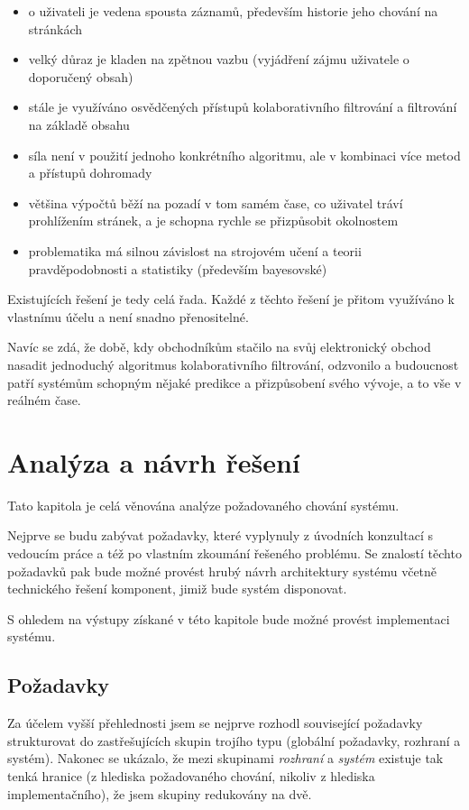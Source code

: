 \documentclass[thesis=M,czech]{FITthesis}[2014/05/07]
\begin{document}
\begin{itemize}
	\item o uživateli je vedena spousta záznamů, především historie jeho chování na stránkách
	\item velký důraz je kladen na zpětnou vazbu (vyjádření zájmu uživatele o doporučený obsah)
	\item stále je využíváno osvědčených přístupů kolaborativního filtrování a filtrování na základě obsahu
	\item síla není v použití jednoho konkrétního algoritmu, ale v kombinaci více metod a přístupů dohromady
	\item většina výpočtů běží na pozadí v tom samém čase, co uživatel tráví prohlížením stránek, a je schopna rychle se přizpůsobit okolnostem
	\item problematika má silnou závislost na strojovém učení a teorii pravděpodobnosti a statistiky (především bayesovské)
\end{itemize}

Existujících řešení je tedy celá řada. Každé z těchto řešení je přitom využíváno k vlastnímu účelu a není snadno přenositelné.

Navíc se zdá, že době, kdy obchodníkům stačilo na svůj elektronický obchod nasadit jednoduchý algoritmus kolaborativního filtrování, odzvonilo a budoucnost patří systémům schopným nějaké predikce a přizpůsobení svého vývoje, a to vše v reálném čase. 

\chapter{Analýza a návrh řešení}
\label{chap:analysis}

Tato kapitola je celá věnována analýze požadovaného chování systému.

Nejprve se budu zabývat požadavky, které vyplynuly z úvodních konzultací s vedoucím práce a též po vlastním zkoumání řešeného problému. Se znalostí těchto požadavků pak bude možné provést hrubý návrh architektury systému včetně technického řešení komponent, jimiž bude systém disponovat.

S ohledem na výstupy získané v této kapitole bude možné provést implementaci systému.

\section{Požadavky}
\label{sec:req}
Za účelem vyšší přehlednosti jsem se nejprve rozhodl související požadavky strukturovat do zastřešujících skupin trojího typu (globální požadavky, rozhraní a systém). Nakonec se ukázalo, že mezi skupinami \emph{rozhraní} a \emph{systém} existuje tak tenká hranice (z hlediska požadovaného chování, nikoliv z hlediska implementačního), že jsem skupiny redukovány na dvě.
\end{document}
